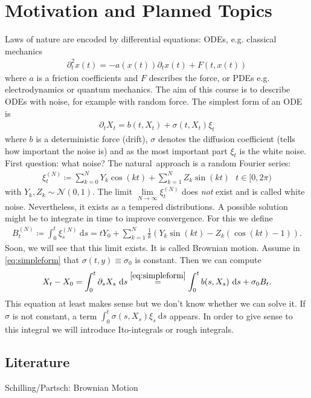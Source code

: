 \chapter*{Motivation and Planned Topics}
Laws of nature are encoded by differential equations: ODEs, e.g. classical mechanics 
\begin{align*}
\partial_t^2 x(t)=-a(x(t))\partial_t x(t)+F(t,x(t))
\end{align*}
where $a$ is a friction coefficients and $F$ describes the force,
or PDEs e.g. electrodynamics or quantum mechanics.
The aim of this course is to describe ODEs with noise, for example with random force.
The simplest form of an ODE is
\begin{align}\label{eq:simpleform}
\partial_t X_t=b(t,X_t)+\sigma(t,X_t)\xi_t
\end{align}
where $b$ is a deterministic force (drift), $\sigma$ denotes the diffusion coefficient (tells how important the noise is) and as the most important part
$\xi_t$ is the white noise.
First question: what noise?
The \glqq natural\grqq\, approach is a random Fourier series:
\begin{align}
\xi_t^{(N)}\coloneqq \sum_{k=0}^N Y_k \cos(kt)+ \sum_{k=1}^N Z_k \sin(kt)~~~t\in [0,2\pi)
\end{align}
with $Y_k,Z_k \sim \mathcal{N}(0,1)$.
The limit $\lim\limits_{N\to \infty} \xi_t^{(N)}$ does \emph{not} exist and is called \glqq white noise\grqq.
Nevertheless, it exists as a tempered distributions.
A possible solution might be to integrate in time to improve convergence. For this we define
\begin{align}
B_t^{(N)}\coloneqq \int_0^t\xi_s^{(N)}~\mathrm{d}s=tY_0+\sum_{k=1}^N \frac{1}{k}(Y_k\sin(kt)-Z_k(\cos(kt)-1)).
\end{align}
Soon, we will see that this limit exists. It is called \glqq Brownian motion\grqq.
Assume in \eqref{eq:simpleform} that $\sigma(t,y)\equiv \sigma_0$ is constant. Then we can compute
\begin{align*}
X_t-X_0=\int_0^t \partial_s X_s~\mathrm{d}s\overset{\eqref{eq:simpleform}}{=}\int_0^t b(s,X_s)~\mathrm{d}s+\sigma_0 B_t.
\end{align*}
This equation at least makes sense but we don't know whether we can solve it.
If $\sigma$ is not constant, a term $\int_0^t\sigma(s,X_s)\xi_s~\mathrm{d}s$ appears.
In order to give sense to this integral we will introduce Ito-integrals or rough integrals.

\section*{Literature}
Schilling/Partsch: \glqq Brownian Motion\grqq